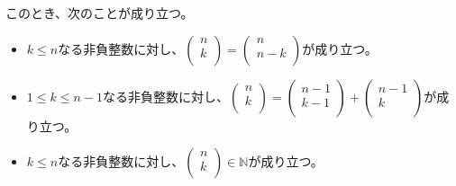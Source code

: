 \documentclass[dvipdfmx]{jsarticle}
\begin{document}
\begin{thm}\label{3.3.1.9}
このとき、次のことが成り立つ。
\begin{itemize}
\item
  $k \leq n$なる非負整数に対し、$\begin{pmatrix}
  n \\
  k \\
  \end{pmatrix} = \begin{pmatrix}
  n \\
  n - k \\
  \end{pmatrix}$が成り立つ。
\item
  $1 \leq k \leq n - 1$なる非負整数に対し、$\begin{pmatrix}
  n \\
  k \\
  \end{pmatrix} = \begin{pmatrix}
  n - 1 \\
  k - 1 \\
  \end{pmatrix} + \begin{pmatrix}
  n - 1 \\
  k \\
  \end{pmatrix}$が成り立つ。
\item
  $k \leq n$なる非負整数に対し、$\begin{pmatrix}
  n \\
  k \\
  \end{pmatrix} \in \mathbb{N}$が成り立つ。
\end{itemize}
\end{thm}
\end{document}
